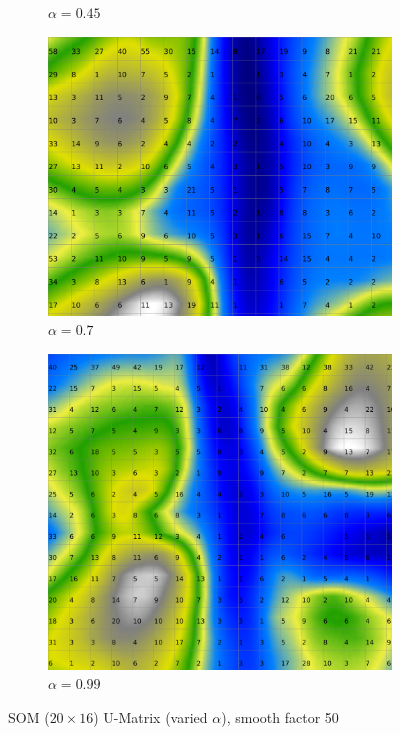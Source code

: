 \documentclass{acm_proc_article-sp}
\begin{document}
\begin{figure}
\begin{subfigure}[b]{0.24\linewidth}
        \caption{$\alpha=0.45$}
        \label{fig:wine-20x16-smoothed-data-histogram-alpha-0.45-f-50}
    \end{subfigure}
    \begin{subfigure}[b]{0.24\linewidth}
        \includegraphics[width=\linewidth]{img/wine-20x16-smoothed-data-histogram-alpha-0.7-f-50}
        \caption{$\alpha=0.7$}
        \label{fig:wine-20x16-smoothed-data-histogram-alpha-0.7-f-50}
    \end{subfigure}
    \begin{subfigure}[b]{0.24\linewidth}
        \includegraphics[width=\linewidth]{img/wine-20x16-smoothed-data-histogram-alpha-0.99-f-50}
        \caption{$\alpha=0.99$}
        \label{fig:wine-20x16-smoothed-data-histogram-alpha-0.99-f-50}
    \end{subfigure}
    \caption{SOM ($20\times16$) U-Matrix (varied $\alpha$), smooth factor 50}
    \label{fig:wine-20x16-smoothed-data-histogram-alpha-f-50}
\end{figure}
\end{document}
